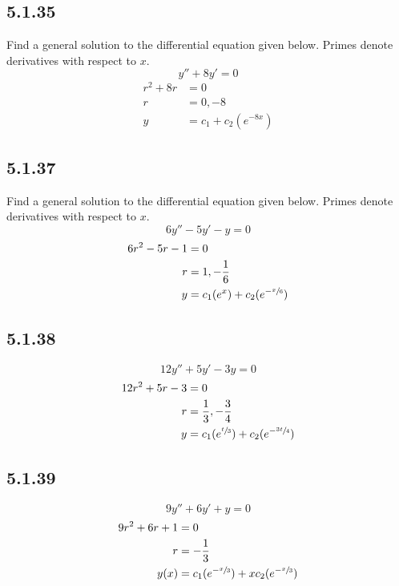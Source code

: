 \documentclass{article}
\begin{document}
\subsection{5.1.35}
Find a general solution to the differential equation given below. Primes denote derivatives with respect to $ x $.
$$ y'' + 8y' = 0 $$
\begin{align*}
	r^2 + 8r & = 0 \\
	r & = 0, -8 \\
	y & = c_1 + c_2(e^{-8x})
\end{align*}

\subsection{5.1.37}
Find a general solution to the differential equation given below. Primes denote derivatives with respect to $ x $.
$$ 6y'' - 5y' - y = 0 $$
\begin{align*}
	6r^2 - 5r - 1 & = 0 \\
	r & = 1, -\frac{1}{6} \\
	y & = c_1(e^x) + c_2(e^{-\sfrac{x}{6}})
\end{align*}

\subsection{5.1.38}
$$ 12y'' + 5y' - 3y = 0 $$
\begin{align*}
	12r^2 + 5r - 3 & = 0 \\
	r & = \frac{1}{3}, -\frac{3}{4} \\
	y & = c_1(e^{\sfrac{t}{3}}) + c_2(e^{-\sfrac{3t}{4}})
\end{align*}

\subsection{5.1.39}
$$ 9y'' + 6y' + y = 0 $$
\begin{align*}
	9r^2 + 6r + 1 & = 0 \\
	r & = -\frac{1}{3} \\
	y(x) & = c_1(e^{-\sfrac{x}{3}}) + xc_2(e^{-\sfrac{x}{3}})
\end{align*}
\end{document}
